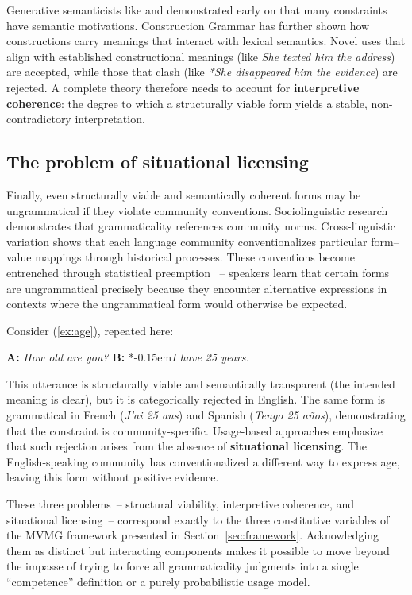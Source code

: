 \documentclass[12pt,letterpaper]{article}
\newcommand{\mention}[1]{\textit{#1}}
\newcommand{\judgesep}{\kern-0.15em}
\newcommand{\ungram}[1]{*\judgesep#1}
\begin{document}
Generative semanticists like \textcite{lakoff1971} and \textcite{mccawley1968} demonstrated early on that many constraints have semantic motivations. Construction Grammar \autocite{goldberg1995constructions} has further shown how constructions carry meanings that interact with lexical semantics. Novel uses that align with established constructional meanings (like \mention{She texted him the address}) are accepted, while those that clash (like \textit{*She disappeared him the evidence}) are rejected. A complete theory therefore needs to account for \textbf{interpretive coherence}: the degree to which a structurally viable form yields a stable, non-contradictory interpretation.

\subsection{The problem of situational licensing}\label{sec:impasse-licensing}

Finally, even structurally viable and semantically coherent forms may be ungrammatical if they violate community conventions. Sociolinguistic research \autocite{labov1972} demonstrates that grammaticality references community norms. Cross-linguistic variation shows that each language community conventionalizes particular form--value mappings through historical processes. These conventions become entrenched through statistical preemption \autocite{Goldberg2011}~-- speakers learn that certain forms are ungrammatical precisely because they encounter alternative expressions in contexts where the ungrammatical form would otherwise be expected.

Consider (\ref{ex:age}), repeated here:

\ea
\textbf{A:} \mention{How old are you?} \textbf{B:} \ungram{\mention{I have 25 years.}}
\z

This utterance is structurally viable and semantically transparent (the intended meaning is clear), but it is categorically rejected in English. The same form is grammatical in French (\textit{J'ai 25 ans}) and Spanish (\textit{Tengo 25 años}), demonstrating that the constraint is community-specific. Usage-based approaches \autocite{bybee2006} emphasize that such rejection arises from the absence of \textbf{situational licensing}. The English-speaking community has conventionalized a different way to express age, leaving this form without positive evidence.

\bigskip
These three problems~-- structural viability, interpretive coherence, and situational licensing~-- correspond exactly to the three constitutive variables of the MVMG framework presented in Section~\ref{sec:framework}. Acknowledging them as distinct but interacting components makes it possible to move beyond the impasse of trying to force all grammaticality judgments into a single \enquote{competence} definition or a purely probabilistic usage model.
\end{document}
